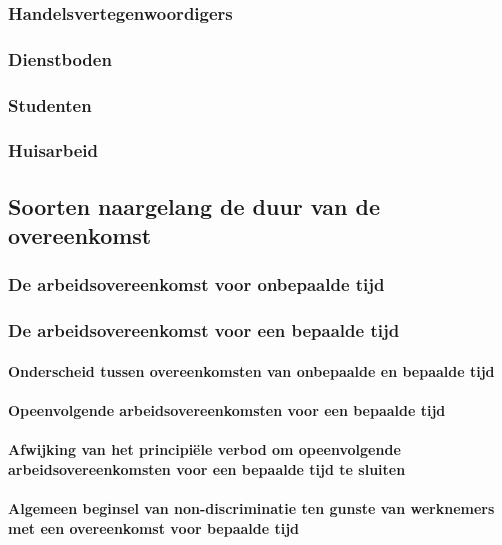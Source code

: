 \subsubsection{Handelsvertegenwoordigers}

\subsubsection{Dienstboden}

\subsubsection{Studenten}

\subsubsection{Huisarbeid}

\subsection{Soorten naargelang de duur van de overeenkomst}

\subsubsection{De arbeidsovereenkomst voor onbepaalde tijd}

\subsubsection{De arbeidsovereenkomst voor een bepaalde tijd}

\paragraph{Onderscheid tussen overeenkomsten van onbepaalde en bepaalde tijd}

\paragraph{Opeenvolgende arbeidsovereenkomsten voor een bepaalde tijd}

\paragraph{Afwijking van het principiële verbod om opeenvolgende arbeidsovereenkomsten voor een bepaalde tijd te sluiten}

\paragraph{Algemeen beginsel van non-discriminatie ten gunste van werknemers met een overeenkomst voor bepaalde tijd}

